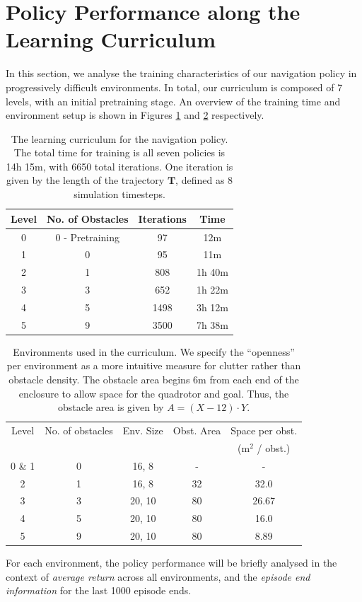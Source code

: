 \section{Policy Performance along the Learning Curriculum}
\label{sec:7_learning_curriculum}
In this section, we analyse the training characteristics of our navigation policy in progressively difficult environments. In total, our curriculum is composed of 7 levels, with an initial pretraining stage. An overview of the training time and environment setup is shown in Figures \ref{tab:7_curriculum} and
\ref{tab:7_curriculum_space} respectively.
\begin{table}[hbt]
    \centering
    \begin{tabular}{||c|c|c|c||}
    \hline
    Level & No. of Obstacles & Iterations & Time \\
    \hline\hline
    0 & 0 - Pretraining & 97 & 12m \\ \hline
    1 & 0 & 95 & 11m \\ \hline
    2 & 1 & 808 & 1h 40m \\ \hline
    3 & 3 & 652 & 1h 22m \\ \hline
    4 & 5 & 1498 & 3h 12m \\ \hline
    5 & 9 & 3500 & 7h 38m \\ \hline
    \end{tabular}
    \caption{The learning curriculum for the navigation policy. The total time for training is all seven policies is 14h 15m, with 6650 total iterations. One iteration is given by the length of the trajectory $\boldsymbol{T}$, defined as 8 simulation timesteps.}
    \label{tab:7_curriculum}
\end{table}
\begin{table}[hbt]
    \centering
    \begin{tabular}{||c|c|c|c|c||}
    \hline
    Level & No. of obstacles & Env. Size & Obst. Area & Space per obst. \\  & & & & (m$^2$ / obst.) \\\hline\hline
    0 \& 1 & 0 & 16, 8 & - & - \\\hline
    2 & 1 & 16, 8 & 32 & 32.0 \\\hline
    3 & 3 & 20, 10 & 80 & 26.67 \\\hline
    4 & 5 & 20, 10 & 80 & 16.0 \\\hline
    5 & 9 & 20, 10 & 80 & 8.89 \\\hline
    \end{tabular}
    \caption{Environments used in the curriculum. We specify the ``openness'' per environment as a more intuitive measure for clutter rather than obstacle density. The obstacle area begins 6m from each end of the enclosure to allow space for the quadrotor and goal. Thus, the obstacle area is given by $A = (X - 12) \cdot Y$.}
    \label{tab:7_curriculum_space}
\end{table}
For each environment, the policy performance will be briefly analysed in the context of \textit{average return} across all environments, and the \textit{episode end information} for the last 1000 episode ends.

